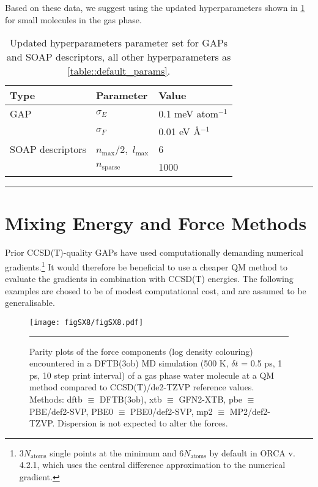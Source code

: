 \documentclass[11pt]{article}
\numberwithin{equation}{subsection}
\begin{document}
Based on these data, we suggest using the updated hyperparameters shown in \tablename{ \ref{table::updated_params}} for small molecules in the gas phase.

\begin{table}[h!]
	\def\arraystretch{1.3}
	\begin{tabularx}{\textwidth}{YYY}
		\hline
		Type&	Parameter	&Value\\
		\hline
		GAP	   &  $\sigma_E$	&  	0.1 meV atom${}^{-1}$ \\
			   &  $\sigma_F$	&  	0.01 eV \AA${}^{-1}$
		\\
		SOAP descriptors  
		&$n_\text{max}/2,$ $l_\text{max}$&6  \\
		 
		&$n_\text{sparse}$ &1000              
	\end{tabularx}
	\hrule
	\vspace{0.1cm}
	\caption{Updated hyperparameters parameter set for GAPs and SOAP descriptors, all other hyperparameters as {\tablename{ \ref{table::default_params}}}.}
	\label{table::updated_params}
\end{table}




\clearpage
\section{Mixing Energy and Force Methods}

Prior CCSD(T)-quality GAPs\cite{gaptrain2021} have used computationally demanding numerical gradients.\footnote{$3N_\text{atoms}$ single points at the minimum and $6N_\text{atoms}$ by default in ORCA v. 4.2.1, which uses the central difference approximation to the numerical gradient.} It would therefore be beneficial to use a cheaper QM method to evaluate the gradients in combination with CCSD(T) energies. The following examples are chosed to be of modest computational cost, and are assumed to be generalisable.


\begin{figure}[h!]
	\centering
	\texttt{[image: figSX8/figSX8.pdf]}
	\vspace{0.1cm}
	\hrule
	\vspace{0.1cm}
	\caption{Parity plots of the force components (log density colouring) encountered in a DFTB(3ob) MD simulation (500 K, $\delta t$ = 0.5 ps, 1 ps, 10 step print interval) of a gas phase water molecule at a QM method compared to CCSD(T)/de2-TZVP reference values. Methods: dftb $\equiv$ DFTB(3ob), xtb $\equiv$ GFN2-XTB, pbe $\equiv$ PBE/def2-SVP, PBE0 $\equiv$ PBE0/def2-SVP, mp2 $\equiv$ MP2/def2-TZVP. Dispersion is not expected to alter the forces.}
	\label{fig::SX8}
\end{figure}
\end{document}
